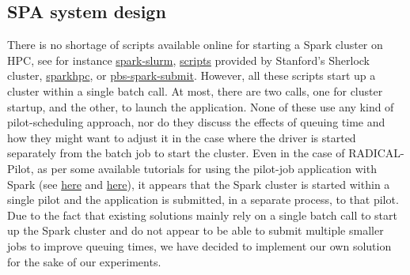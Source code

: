 	\subsection{SPA system design}
    
	There is no shortage of scripts available online for starting a Spark
	cluster on HPC, see for instance
	\href{https://github.com/NIH-HPC/spark-slurm}{spark-slurm},
	\href{https://www.sherlock.stanford.edu/docs/software/using/spark}{scripts}
	provided by Stanford's Sherlock cluster,
	\href{https://sparkhpc.readthedocs.io}{sparkhpc}, or
	\href{https://www.osc.edu/~troy/pbstools/man/pbs-spark-submit}{pbs-spark-submit}.
	However, all these scripts start up a cluster within a single batch
	call. At most, there are two calls, one for cluster startup, and the
	other, to launch the application. None of these use any kind of
	pilot-scheduling approach, nor do they discuss the effects of queuing
	time and how they might want to adjust it in the case where the driver
	is started separately from the batch job to start the cluster. Even in
	the case of RADICAL-Pilot, as per some available tutorials for using the
	pilot-job application with Spark (see
	\href{https://github.com/radical-cybertools/pilot-streaming/blob/master/examples/Pilot-Streaming-GettingStarted.ipynb}{here}
	and
	\href{https://github.com/radical-cybertools/MIDAS-tutorial/blob/master/pilot/Pilot-Spark.ipynb}{here}),
	it appears that the Spark cluster is started within a single pilot and
	the application is submitted, in a separate process, to that pilot. Due
	to the fact that existing solutions mainly rely on a single batch call
	to start up the Spark cluster and do not appear to be able to submit
	multiple smaller jobs to improve queuing times, we have decided to
	implement our own solution for the sake of our experiments.
    
